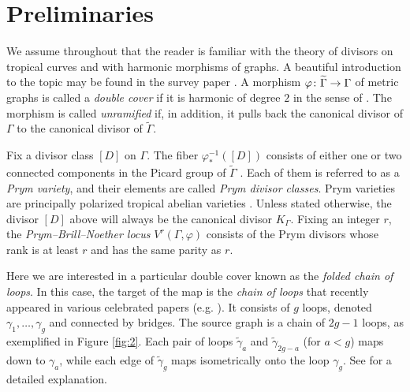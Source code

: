 \documentclass[11pt,reqno]{amsart}
\newcommand*{\maps}{\nobreak\mskip2mu\mathpunct{}\nonscript
  \mkern-\thinmuskip{:}\mskip6muplus1mu\relax}
\newcommand*{\ti}[1]{\tilde{#1}}
\newcommand*{\wti}[1]{\widetilde{#1}}
\DeclareMathOperator{\Jac}{Jac}
\theoremstyle{definition}
\theoremstyle{problem}
\theoremstyle{plain}
\theoremstyle{remark}
\theoremstyle{theorem}
\numberwithin{equation}{section}
\numberwithin{figure}{section}
\begin{document}
\section{Preliminaries}\label{sec:preliminaries}
We assume throughout that the reader is familiar with the theory of
divisors on tropical curves and with harmonic morphisms of graphs. A
beautiful introduction to the topic may be found in the survey paper
\cite{BJ}.  A morphism $\varphi\maps\wti\Gamma\to\Gamma$ of metric
graphs is called a \emph{double cover} if it is harmonic of degree $2$
in the sense of \cite{ABBR15}. The morphism is called
\emph{unramified} if, in addition, it pulls back the canonical divisor
of $\Gamma$ to the canonical divisor of $\widetilde\Gamma$.



Fix a divisor class $[D]$ on $\Gamma$. The fiber
$\varphi^{-1}_{*}([D])$ consists of either one or two connected
components in the Picard group of $\widetilde\Gamma$ \cite[Proposition
6.1]{JL}. Each of them is referred to as a \emph{Prym variety}, and
their elements are called \textit{Prym divisor classes}.  Prym
varieties are principally polarized tropical abelian varieties
\cite[Theorem 2.3.7]{len2019skeletons}.  Unless stated otherwise, the
divisor $[D]$ above will always be the canonical divisor $K_\Gamma$.
Fixing an integer $r$, the \emph{Prym--Brill--Noether locus}
$V^r(\Gamma,\varphi)$ consists of the Prym divisors whose rank is at
least $r$ and has the same parity as $r$.

Here we are interested in a particular double cover known as the
\emph{folded chain of loops}. In this case, the target of the map is
the \emph{chain of loops} that recently appeared in various celebrated
papers (e.g. \cite{MRC, Pflueger, JR}). It consists of $g$ loops,
denoted $\gamma_1,\ldots,\gamma_g$ and connected by bridges. The
source graph is a chain of $2g-1$ loops, as exemplified in Figure
\ref{fig:2}.  Each pair of loops $\ti\gamma_a$ and $\ti\gamma_{2g-a}$
(for $a<g$) maps down to $\gamma_a$, while each edge of $\ti\gamma_g$
maps isometrically onto the loop $\gamma_g$.  See \cite[Section
5.2]{len2019skeletons} for a detailed explanation.
\end{document}
